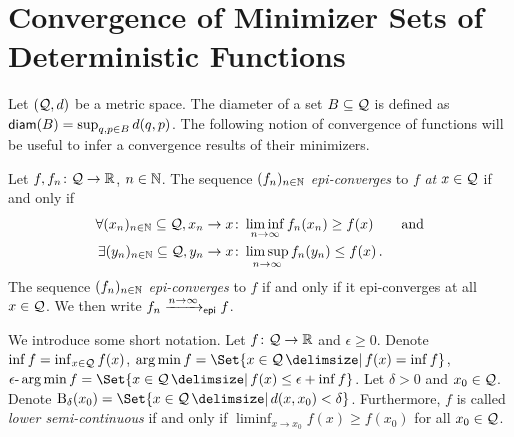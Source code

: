 \section{Convergence of Minimizer Sets of Deterministic Functions}\label{sec:det}
%
Let $(\mathcal{Q}, d)$ be a metric space. The diameter of a set $B\subseteq \mathcal{Q}$ is defined as $\operatorname{\mathsf{diam}}(B) = \sup_{q,p\in B} d(q,p)$. The following notion of convergence of functions will be useful to infer a convergence results of their minimizers.
%
\begin{definition}
	Let $f,f_n \colon \mathcal{Q}\to\mathbb{R}$, $n\in\mathbb{N}$.
	The sequence $(f_n)_{n\in\mathbb{N}}$ \emph{epi-converges} to $f$ \emph{at} $x\in\mathcal{Q}$ if and only if
	\begin{align*}
	\forall (x_n)_{n\in\mathbb{N}} \subseteq \mathcal{Q}, x_n \to x \colon& \liminf_{n\to\infty} f_n(x_n) \geq f(x)\qquad\text{and}\\
	\exists (y_n)_{n\in\mathbb{N}} \subseteq \mathcal{Q}, y_n \to x \colon& \limsup_{n\to\infty} f_n(y_n) \leq f(x)
	\, .
	\end{align*}
	The sequence $(f_n)_{n\in\mathbb{N}}$ \emph{epi-converges} to $f$ if and only if it epi-converges at all $x\in\mathcal{Q}$. We then write $f_n\xrightarrow{n\to\infty}_{\mathsf{epi}} f$.
\end{definition}
%
We introduce some short notation. Let $f \colon \mathcal{Q} \to \mathbb{R}$ and $\epsilon\geq 0$. Denote $\inf f = \inf_{x\in\mathcal{Q}}f(x)$, $\argmin f = \Set{x \in\MS \given f(x) = \inf f}$, $\epsilon\text{-}\argmin f = \Set{x\in\MS \given  f(x) \leq \epsilon +\inf f }$.
Let $\delta > 0$ and $x_0\in\mathcal{Q}$.
Denote $\ball_\delta(x_0) = \Set{x\in\MS \given  d(x, x_0) < \delta}$.
Furthermore, $f$ is called \emph{lower semi-continuous} if and only if  $\liminf_{x\to x_0} f(x) \geq f(x_0)$ for all $x_0\in\mathcal{Q}$. 
%

